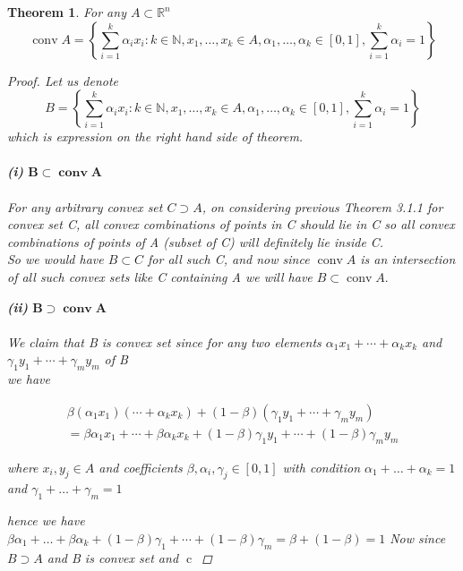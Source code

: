 \documentclass[oneside]{book}
\newtheorem{theorem}{Theorem}[section]
\begin{document}
\begin{theorem}
\label{t:5.8}
For  any $A \subset \mathbb{R}^n$
 $$ \operatorname{conv} A=\left\{\sum_{i=1}^{k} \alpha_{i} x_{i}: k \in \mathbb{N}, x_{1}, \ldots, x_{k} \in A, \alpha_{1}, \ldots, \alpha_{k} \in[0,1], \sum_{i=1}^{k} \alpha_{i}=1\right\} $$

 \begin{proof}
 Let us denote $$ B = \left\{\sum_{i=1}^{k} \alpha_{i} x_{i}: k \in \mathbb{N}, x_{1}, \ldots, x_{k} \in A, \alpha_{1}, \ldots, \alpha_{k} \in[0,1], \sum_{i=1}^{k} \alpha_{i}=1\right\} $$  which is expression on the right hand side of theorem.\\\\
 \textbf{(i)}  $ \mathbf{B} \subset \mathbf{\operatorname{conv} A}  $\\\\
     For any arbitrary convex set $C \supset A$, on considering previous Theorem 3.1.1 for convex set C, all convex combinations of points in C should lie in C so all convex combinations of points of A (subset of  C) will definitely lie inside C. \\ 
 So we would have $B\subset C $ for all such C, and now since  $\operatorname{conv} A $ is an intersection of all such convex sets like C containing A we will have  $ B \subset \operatorname{conv} A.  $  
 
 \textbf{(ii)}  $ \mathbf{B} \supset \mathbf{\operatorname{conv} A}  $\\\\
 We claim that B is convex set since for any two elements $\alpha_{1} x_{1}+\cdots+\alpha_{k} x_{k}$ and \\ $\gamma_{1} y_{1}+\cdots+\gamma_{m} y_{m}$  of B \\
 we have 
 
 
\begin{multline}
         \beta\left(\alpha_{1} x_{1}\right)  \left(\cdots+\alpha_{k} x_{k} \right) +(1-\beta)\left(\gamma_{1} y_{1}+\cdots+\gamma_{m} y_{m}\right) \\ = \beta \alpha_{1} x_{1}+\cdots+\beta \alpha_{k} x_{k}+(1-\beta) \gamma_{1} y_{1}+\cdots+(1-\beta) \gamma_{m} y_{m}  
\end{multline}
 
 where  $x_{i}, y_{j} \in A$ and coefficients $\beta, \alpha_{i}, \gamma_{j} \in[0,1]$ with  condition $\alpha_{1}+\ldots+\alpha_{k}=1$ and $\gamma_{1}+\ldots+\gamma_{m}=1$ 

hence we have \\
$
\beta \alpha_{1}+\ldots+\beta \alpha_{k}+(1-\beta) \gamma_{1}+\cdots+(1-\beta) \gamma_{m}=\beta+(1-\beta)=1
$
Now since $ B \supset A $ and B is convex set and $\operatorname{c}$
 

\end{proof}
\end{theorem}
\end{document}

